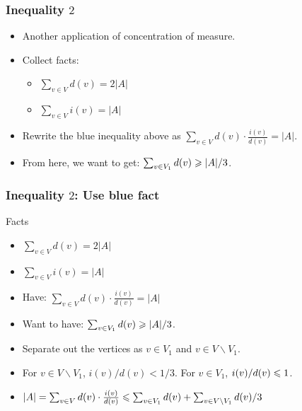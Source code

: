 \documentclass{beamer}
\begin{document}
\begin{frame}
\frametitle{Inequality $2$}
\begin{itemize}
\item Another application of concentration of measure.
\item Collect facts:
\begin{itemize}
\item {\color{red} $\sum_{v\in V} d(v) = 2|A|$}
\item {\color{blue} $\sum_{v \in V} i(v) = |A|$}
\end{itemize}
\item Rewrite the {\color{blue} blue} inequality above as {\color{blue} $\sum_{v \in V} d(v)\cdot\frac{i(v)}{d(v)} = |A|$}. 
\item From here, we want to get: $\sum_{v\in V_1} d(v) \geqslant |A|/3$.
\end{itemize}
\end{frame}

\begin{frame}
\frametitle{Inequality $2$: Use {\color{blue} blue} fact}
\begin{block}{Facts}
\begin{itemize}
\item {\color{red} $\sum_{v\in V} d(v) = 2|A|$}
\item {\color{blue} $\sum_{v \in V} i(v) = |A|$}
\end{itemize}
\end{block}
\begin{itemize}
\item Have: {\color{blue} $\sum_{v \in V} d(v)\cdot\frac{i(v)}{d(v)} 
= |A|$}
\item Want to have: $\sum_{v\in V_1} d(v) \geqslant |A|/3$.
\item Separate out the vertices as $v\in V_1$ and $v\in V\backslash V_1$. 
\item For $v \in V \backslash V_1$, $i(v)/d(v) < 1/3$. For $v \in V_1$, $i(v)/d(v) \leqslant 1$. 
\item {\color{blue} $|A| = \sum_{v \in V} d(v)\cdot\frac{i(v)}{d(v)} \leqslant \sum_{v \in V_1} d(v) + \sum_{v\in V\backslash V_1} d(v)/3$}
\end{itemize}
\end{frame}
\end{document}
